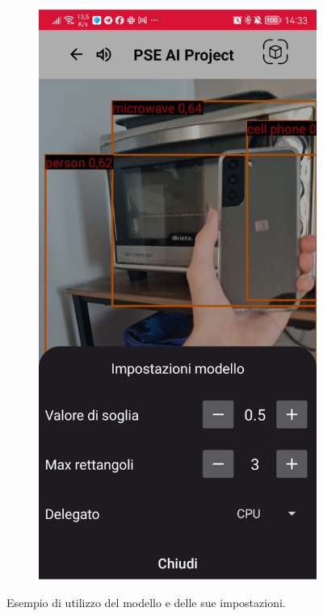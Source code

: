 \begin{figure}[H]
\begin{subfigure}[b]{0.3\textwidth}
  \end{subfigure}
  \begin{subfigure}[b]{0.3\textwidth}
    \includegraphics[width=\textwidth, height=0.45\textheight]{Immagini/App/funzionamento_impostazioni.png}
  \end{subfigure}
  \caption{Esempio di utilizzo del modello e delle sue impostazioni.}
  \label{fig:funzionamento1}
\end{figure}

